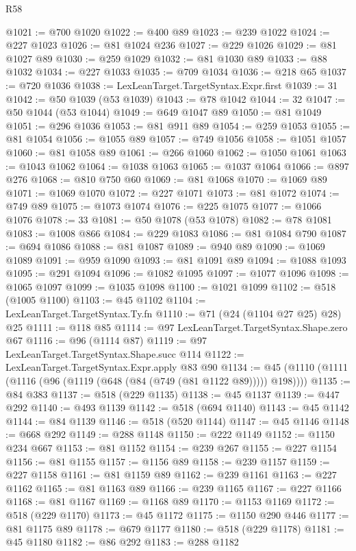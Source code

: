 \begin{lexlean}{R58}
\begin{coremodule}
@1021 := @700 @1020
@1022 := @400 @89
@1023 := @239 @1022
@1024 := @227 @1023
@1026 := @81 @1024 @236
@1027 := @229 @1026
@1029 := @81 @1027 @89
@1030 := @259 @1029
@1032 := @81 @1030 @89
@1033 := @88 @1032
@1034 := @227 @1033
@1035 := @709 @1034
@1036 := @218 @65
@1037 := @720 @1036
@1038 := LexLeanTarget.TargetSyntax.Expr.first
@1039 := 31
@1042 := @50 @1039 (@53 @1039)
@1043 := @78 @1042
@1044 := 32
@1047 := @50 @1044 (@53 @1044)
@1049 := @649 @1047 @89
@1050 := @81 @1049
@1051 := @296 @1036
@1053 := @81 @911 @89
@1054 := @259 @1053
@1055 := @81 @1054
@1056 := @1055 @89
@1057 := @749 @1056
@1058 := @1051 @1057
@1060 := @81 @1058 @89
@1061 := @266 @1060
@1062 := @1050 @1061
@1063 := @1043 @1062
@1064 := @1038 @1063
@1065 := @1037 @1064
@1066 := @897 @276
@1068 := @810 @750 @60
@1069 := @81 @1068
@1070 := @1069 @89
@1071 := @1069 @1070
@1072 := @227 @1071
@1073 := @81 @1072
@1074 := @749 @89
@1075 := @1073 @1074
@1076 := @225 @1075
@1077 := @1066 @1076
@1078 := 33
@1081 := @50 @1078 (@53 @1078)
@1082 := @78 @1081
@1083 := @1008 @866
@1084 := @229 @1083
@1086 := @81 @1084 @790
@1087 := @694 @1086
@1088 := @81 @1087
@1089 := @940 @89
@1090 := @1069 @1089
@1091 := @959 @1090
@1093 := @81 @1091 @89
@1094 := @1088 @1093
@1095 := @291 @1094
@1096 := @1082 @1095
@1097 := @1077 @1096
@1098 := @1065 @1097
@1099 := @1035 @1098
@1100 := @1021 @1099
@1102 := @518 (@1005 @1100)
@1103 := @45 @1102
@1104 := LexLeanTarget.TargetSyntax.Ty.fn
@1110 := @71 (@24 (@1104 @27 @25) @28) @25
@1111 := @118 @85
@1114 := @97 LexLeanTarget.TargetSyntax.Shape.zero @67
@1116 := @96 (@1114 @87)
@1119 := @97 LexLeanTarget.TargetSyntax.Shape.succ @114
@1122 := LexLeanTarget.TargetSyntax.Expr.apply @83 @90
@1134 := @45 (@1110 (@1111 (@1116 (@96 (@1119 (@648 (@84 (@749 (@81 @1122 @89))))) @198))))
@1135 := @84 @383
@1137 := @518 (@229 @1135)
@1138 := @45 @1137
@1139 := @447 @292
@1140 := @493 @1139
@1142 := @518 (@694 @1140)
@1143 := @45 @1142
@1144 := @84 @1139
@1146 := @518 (@520 @1144)
@1147 := @45 @1146
@1148 := @668 @292
@1149 := @288 @1148
@1150 := @222 @1149
@1152 := @1150 @234 @667
@1153 := @81 @1152
@1154 := @239 @267
@1155 := @227 @1154
@1156 := @81 @1155
@1157 := @1156 @89
@1158 := @239 @1157
@1159 := @227 @1158
@1161 := @81 @1159 @89
@1162 := @239 @1161
@1163 := @227 @1162
@1165 := @81 @1163 @89
@1166 := @239 @1165
@1167 := @227 @1166
@1168 := @81 @1167
@1169 := @1168 @89
@1170 := @1153 @1169
@1172 := @518 (@229 @1170)
@1173 := @45 @1172
@1175 := @1150 @290 @446
@1177 := @81 @1175 @89
@1178 := @679 @1177
@1180 := @518 (@229 @1178)
@1181 := @45 @1180
@1182 := @86 @292
@1183 := @288 @1182

\end{coremodule}
\end{lexlean}
